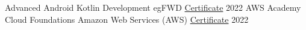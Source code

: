 


\begin{cvhonors}

  \cvhonor
    {Advanced Android Kotlin Development} %
    {egFWD} %
    {\href{https://confirm.udacity.com/MHN2ZU5P}{Certificate}} %
    {2022} %
     \cvhonor
    {AWS Academy Cloud Foundations} %
    {Amazon Web Services (AWS)} %
    {\href{https://www.credly.com/badges/39661046-4d36-4c2b-83cf-1a730f6b86ea?source=linked_in_profile}{Certificate}} %
    {2022} %
\end{cvhonors}